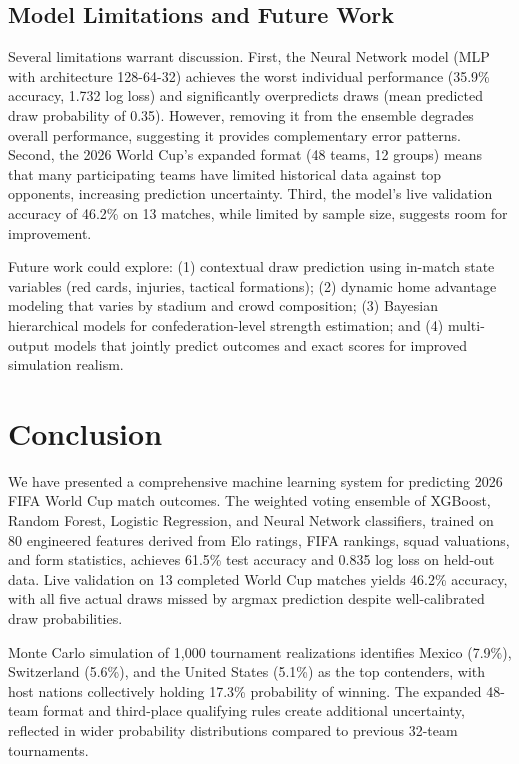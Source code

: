 \documentclass[11pt,a4paper]{article}
\newcommand{\Elo}{Elo}
\begin{document}
\subsection{Model Limitations and Future Work}
\label{sec:discussion:limitations}

Several limitations warrant discussion. First, the Neural Network model (MLP with architecture 128-64-32) achieves the worst individual performance (35.9\% accuracy, 1.732 log loss) and significantly overpredicts draws (mean predicted draw probability of 0.35). However, removing it from the ensemble degrades overall performance, suggesting it provides complementary error patterns. Second, the 2026 World Cup's expanded format (48 teams, 12 groups) means that many participating teams have limited historical data against top opponents, increasing prediction uncertainty. Third, the model's live validation accuracy of 46.2\% on 13 matches, while limited by sample size, suggests room for improvement.

Future work could explore: (1) contextual draw prediction using in-match state variables (red cards, injuries, tactical formations); (2) dynamic home advantage modeling that varies by stadium and crowd composition; (3) Bayesian hierarchical models for confederation-level strength estimation; and (4) multi-output models that jointly predict outcomes and exact scores for improved simulation realism.

\section{Conclusion}
\label{sec:conclusion}

We have presented a comprehensive machine learning system for predicting 2026 FIFA World Cup match outcomes. The weighted voting ensemble of XGBoost, Random Forest, Logistic Regression, and Neural Network classifiers, trained on 80 engineered features derived from \Elo{} ratings, FIFA rankings, squad valuations, and form statistics, achieves 61.5\% test accuracy and 0.835 log loss on held-out data. Live validation on 13 completed World Cup matches yields 46.2\% accuracy, with all five actual draws missed by argmax prediction despite well-calibrated draw probabilities.

Monte Carlo simulation of 1,000 tournament realizations identifies Mexico (7.9\%), Switzerland (5.6\%), and the United States (5.1\%) as the top contenders, with host nations collectively holding 17.3\% probability of winning. The expanded 48-team format and third-place qualifying rules create additional uncertainty, reflected in wider probability distributions compared to previous 32-team tournaments.
\end{document}
